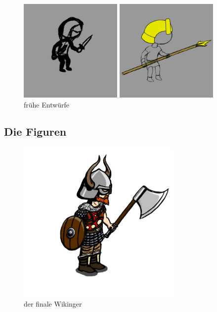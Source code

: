 \documentclass[extern,palatino]{cgBA}
\begin{document}
\begin{figure}[H]
		\raggedleft
		\includegraphics[width=5cm]{assachibi.jpg}
		\raggedright
		\includegraphics[width=5cm]{egychibi.jpg}
		\caption{frühe Entwürfe}
		\label{earlydesign}
\end{figure}
\subsection{Die Figuren}
\begin{figure}[H]
		\centering
		\includegraphics[height=8cm]{viking.jpg}
		\caption{der finale Wikinger}
		\label{viking}
\end{figure}
\end{document}

